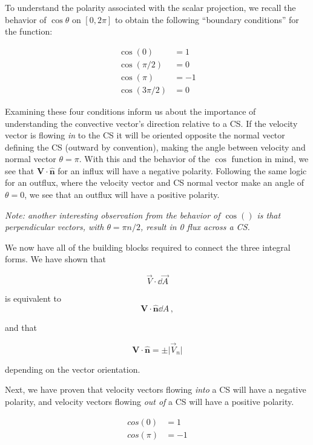 \documentclass[../main.tex]{subfiles}
\begin{document}
\begin{enumerate}[label = (\alph*)]
        To understand the polarity associated with the scalar projection, we recall the behavior of $\cos{\theta}$ on $\left[{0, 2\pi}\right]$ to obtain the following ``boundary conditions'' for the function:

        \begin{align*}
            \cos{(0)} &= 1\\
            \cos{(\pi/2)} &= 0\\
            \cos{(\pi)} &= -1\\
            \cos{(3\pi/2)} &= 0
        \end{align*}

        Examining these four conditions inform us about the importance of understanding the convective vector's direction relative to a CS.
        If the velocity vector is flowing \textit{in} to the CS it will be oriented opposite the normal vector defining the CS (outward by convention), making the angle between velocity and normal vector \(\theta = \pi\).
        With this and the behavior of the $\cos$ function in mind, we see that \(\mathbf{V} \cdot \hat{\mathbf{n}}\) for an influx will have a negative polarity.
        Following the same logic for an outflux, where the velocity vector and CS normal vector make an angle of \(\theta = 0\), we see that an outflux will have a positive polarity.

        \textit{Note: another interesting observation from the behavior of $\cos()$ is that perpendicular vectors, with \(\theta =  \pi n/2\), result in 0 flux across a CS.}

        We now have all of the building blocks required to connect the three integral forms.
        We have shown that

        \[\vec{V} \cdot \dd \vec{A}\]

        is equivalent to
        \[\mathbf{V} \cdot \hat{\mathbf{n}} \dd A\,,\]

        and that 

        \[\mathbf{V} \cdot \hat{\mathbf{n}} = \pm \lvert{\vec{V}_n}\rvert\]

        depending on the vector orientation.

        Next, we have proven that velocity vectors flowing \textit{into} a CS will have a negative polarity, and velocity vectors flowing \textit{out of} a CS will have a positive polarity.
        
        \begin{align*}
        cos(0) &= 1\\
        cos(\pi) &= -1
        \end{align*}


\end{enumerate}
\end{document}
